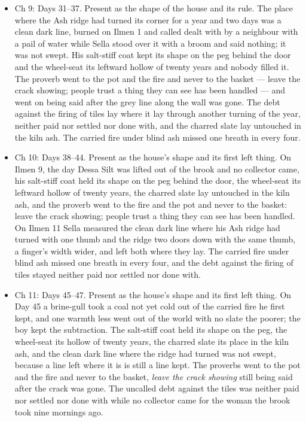\documentclass{design/chronicle}
\begin{document}
{\begin{itemize}[leftmargin=1.4em,itemsep=1pt,topsep=3pt,parsep=0pt]
\item Ch 9: Days 31–37. Present as the shape of the house and its rule. The place where the Ash ridge had turned its corner for a year and two days was a clean dark line, burned on Ilmen 1 and called dealt with by a neighbour with a pail of water while Sella stood over it with a broom and said nothing; it was not swept. His salt-stiff coat kept its shape on the peg behind the door and the wheel-seat its leftward hollow of twenty years and nobody filled it. The proverb went to the pot and the fire and never to the basket --- leave the crack showing; people trust a thing they can see has been handled --- and went on being said after the grey line along the wall was gone. The debt against the firing of tiles lay where it lay through another turning of the year, neither paid nor settled nor done with, and the charred slate lay untouched in the kiln ash. The carried fire under blind ash missed one breath in every four.

\end{itemize}

\begin{itemize}[leftmargin=1.4em,itemsep=1pt,topsep=3pt,parsep=0pt]

\item Ch 10: Days 38–44. Present as the house’s shape and its first left thing. On Ilmen 9, the day Dessa Silt was lifted out of the brook and no collector came, his salt-stiff coat held its shape on the peg behind the door, the wheel-seat its leftward hollow of twenty years, the charred slate lay untouched in the kiln ash, and the proverb went to the fire and the pot and never to the basket: leave the crack showing; people trust a thing they can see has been handled. On Ilmen 11 Sella measured the clean dark line where his Ash ridge had turned with one thumb and the ridge two doors down with the same thumb, a finger’s width wider, and left both where they lay. The carried fire under blind ash missed one breath in every four, and the debt against the firing of tiles stayed neither paid nor settled nor done with.

\end{itemize}

\begin{itemize}[leftmargin=1.4em,itemsep=1pt,topsep=3pt,parsep=0pt]

\item Ch 11: Days 45–47. Present as the house’s shape and its first left thing. On Day 45 a brine-gull took a coal not yet cold out of the carried fire he first kept, and one warmth less went out of the world with no slate the poorer; the boy kept the subtraction. The salt-stiff coat held its shape on the peg, the wheel-seat its hollow of twenty years, the charred slate its place in the kiln ash, and the clean dark line where the ridge had turned was not swept, because a line left where it is is still a line kept. The proverbs went to the pot and the fire and never to the basket, \emph{leave the crack showing} still being said after the crack was gone. The uncalled debt against the tiles was neither paid nor settled nor done with while no collector came for the woman the brook took nine mornings ago.


\end{itemize}}
\end{document}
